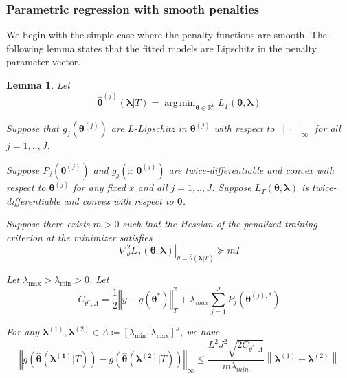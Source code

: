 \documentclass[12pt]{article}
\newtheorem{lemma}{Lemma}
\DeclareMathOperator*{\argmin}{arg\,min}
\begin{document}

\subsubsection{Parametric regression with smooth penalties}
\label{sec:param_smooth}
We begin with the simple case where the penalty functions are smooth. The following lemma states that the fitted models are Lipschitz in the penalty parameter vector.
\begin{lemma}
	\label{lemma:param_add}
	Let 
	\begin{equation}
	\label{eq:param_add_estimator}
	\hat{\boldsymbol{\theta}}^{(j)}\left (\boldsymbol{\lambda} | T \right )  = 
	\argmin_{\boldsymbol{\theta} \in \mathbb{R}^p} L_T \left (\boldsymbol{\theta}, \boldsymbol{\lambda} \right)
	\end{equation}
	
	Suppose that $g_j(\boldsymbol{\theta}^{(j)})$ are $L$-Lipschitz in $\boldsymbol{\theta}^{(j)}$ with respect to $\| \cdot \|_\infty$ for all $j=1,..,J$.
	
	Suppose $P_j(\boldsymbol{\theta}^{(j)})$ and $g_j(x | \boldsymbol{\theta}^{(j)})$ are twice-differentiable and convex with respect to $\boldsymbol{\theta}^{(j)}$ for any fixed $x$ and all $j=1,..,J$. Suppose $L_T \left (\boldsymbol{\theta}, \boldsymbol{\lambda} \right)$ is twice-differentiable and convex with respect to $\boldsymbol{\theta}$.
	
	Suppose there exists $m > 0$ such that the Hessian of the penalized training criterion at the minimizer satisfies 
	\begin{equation}
	\left . \nabla_{\theta}^2 L_T \left (\boldsymbol{\theta}, \boldsymbol{\lambda} \right) \right |_{\theta = \hat{\theta}(\boldsymbol{\lambda} | T )} \succeq mI
	\end{equation}
	
	Let $\lambda_{\max} > \lambda_{\min} > 0 $. Let
	\begin{equation}
	C_{\theta^{*},\Lambda}=
	\frac{1}{2}\left\Vert y- g(\boldsymbol{\theta}^{*})\right\Vert _{T}^{2}
	+\lambda_{max}\sum_{j=1}^{J} P_{j}(\boldsymbol{\theta}^{(j),*})
	\end{equation}
	
	For any $\boldsymbol{\lambda}^{(1)}, \boldsymbol{\lambda}^{(2)} \in \Lambda \coloneqq \left [ \lambda_{\min}, \lambda_{\max} \right ]^J$, we have
	\begin{equation}
	\label{eq:param_add_lipschitz}
	\left\Vert g\left(\hat{\boldsymbol{\theta}}(\boldsymbol{\lambda^{(1)}} | T)\right)-
	g\left(\hat{\boldsymbol{\theta}}(\boldsymbol{\lambda^{(2)}}| T)\right)\right\Vert _{\infty}
	\le
	\frac{L^{2}J^{2}\sqrt{2C_{\theta^{*},\Lambda}}}{m \lambda_{min}}
	\left \|\boldsymbol{\lambda}^{(1)}-\boldsymbol{\lambda}^{(2)} \right \|
	\end{equation}
\end{lemma}
\end{document}

